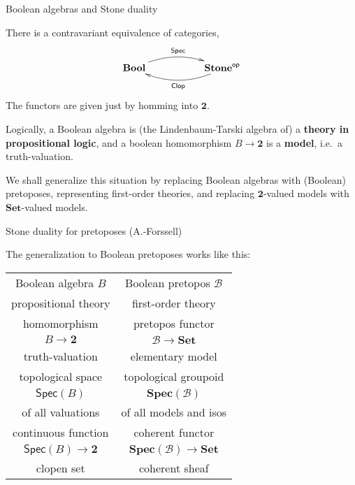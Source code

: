 \documentclass{beamer}
\newcommand{\myemph}[1]{\textbf{#1}}    %
\begin{document}
\begin{frame}{Boolean algebras and Stone duality}

There is a contravariant equivalence of categories,
\[
\xymatrix{ 
\mathbf{Bool}  \ar@/{}^{1pc}/[rr]^{\mathsf{Spec}}     &&  \mathbf{Stone}^{\mathsf{op}}  \ar@/{}^{1pc}/[ll]^{\mathsf{Clop}}  \\
} 
\]
The functors are given just by homming into $\mathbf{2}$.
\medskip

Logically, a Boolean algebra is (the Lindenbaum-Tarski algebra of) a \myemph{theory in propositional logic}, and a boolean homomorphism $B\to \mathbf{2}$ is a \myemph{model}, i.e.\ a truth-valuation.
\medskip

We shall generalize this situation by replacing Boolean algebras with (Boolean) pretoposes, representing first-order theories, and replacing $\mathbf{2}$-valued models with $\mathbf{Set}$-valued models.

\end{frame}
\begin{frame}{Stone duality for pretoposes (A.-Forssell)}

The generalization to Boolean pretoposes works like this:
\medskip

\begin{center}
\begin{tabular}{c|c}
Boolean algebra $B$ & Boolean pretopos $\mathcal{B}$ \\
propositional theory & first-order theory \\
\hline homomorphism & pretopos functor\\
$B\to \mathbf{2}$ &  $\mathcal{B}\to \mathbf{Set}$ \\
truth-valuation & elementary model \\
\hline topological space & topological groupoid \\
 $\mathsf{Spec}(B)$ & $\mathbf{Spec}(\mathcal{B})$ \\
of all valuations & of all models and isos \\
\hline continuous function & coherent functor \\
$\mathsf{Spec}(B) \to \mathbf{2}$  & $\mathbf{Spec}(\mathcal{B}) \to \mathbf{Set}$\\
clopen set & coherent sheaf \\
\end{tabular}
\end{center}

\end{frame}
\end{document}

